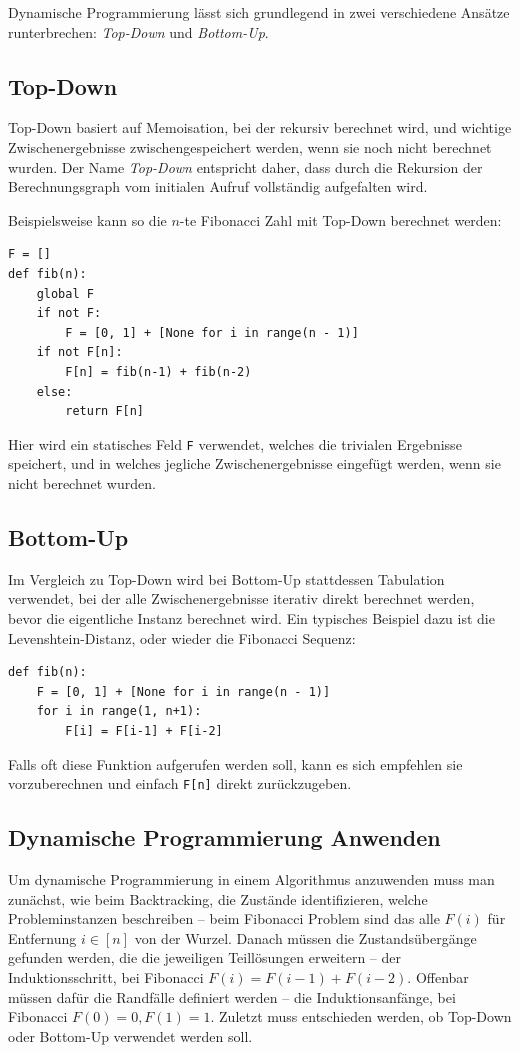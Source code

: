 Dynamische Programmierung lässt sich grundlegend in zwei verschiedene Ansätze runterbrechen: \emph{Top-Down} und \emph{Bottom-Up}.

\subsection{Top-Down}
Top-Down basiert auf Memoisation, bei der rekursiv berechnet wird, und wichtige Zwischenergebnisse zwischengespeichert werden, wenn sie noch nicht berechnet wurden.
Der Name \emph{Top-Down} entspricht daher, dass durch die Rekursion der Berechnungsgraph vom initialen Aufruf vollständig aufgefalten wird.

Beispielsweise kann so die \(n\)-te Fibonacci Zahl mit Top-Down berechnet werden:
\begin{lstlisting}
F = []
def fib(n):
    global F
    if not F:
        F = [0, 1] + [None for i in range(n - 1)]
    if not F[n]:
        F[n] = fib(n-1) + fib(n-2)
    else:
        return F[n]
\end{lstlisting}
Hier wird ein statisches Feld \lstinline|F| verwendet, welches die trivialen Ergebnisse speichert, und in welches jegliche Zwischenergebnisse eingefügt werden, wenn sie nicht berechnet wurden.

\subsection{Bottom-Up}
Im Vergleich zu Top-Down wird bei Bottom-Up stattdessen Tabulation verwendet, bei der alle Zwischenergebnisse iterativ direkt berechnet werden, bevor die eigentliche Instanz berechnet wird.
Ein typisches Beispiel dazu ist die Levenshtein-Distanz, oder wieder die Fibonacci Sequenz:
\begin{lstlisting}
def fib(n):
    F = [0, 1] + [None for i in range(n - 1)]
    for i in range(1, n+1):
        F[i] = F[i-1] + F[i-2]
\end{lstlisting}
Falls oft diese Funktion aufgerufen werden soll, kann es sich empfehlen sie vorzuberechnen und einfach \lstinline|F[n]| direkt zurückzugeben.

\subsection{Dynamische Programmierung Anwenden}
Um dynamische Programmierung in einem Algorithmus anzuwenden muss man zunächst, wie beim Backtracking, die Zustände identifizieren, welche Probleminstanzen beschreiben -- beim Fibonacci Problem sind das alle \(F(i)\) für Entfernung \(i \in [n]\) von der Wurzel.
Danach müssen die Zustandsübergänge gefunden werden, die die jeweiligen Teillösungen erweitern -- der Induktionsschritt, bei Fibonacci \(F(i) = F(i-1) + F(i-2)\).
Offenbar müssen dafür die Randfälle definiert werden -- die Induktionsanfänge, bei Fibonacci \(F(0) = 0, F(1) = 1\).
Zuletzt muss entschieden werden, ob Top-Down oder Bottom-Up verwendet werden soll.

